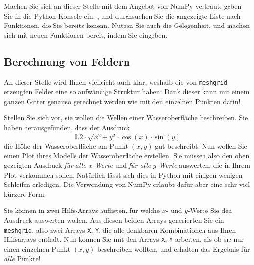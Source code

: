 \begin{hintbox}
Machen Sie sich an dieser Stelle mit dem Angebot von NumPy vertraut: geben Sie in die Python-Konsole ein: , und durchsuchen Sie die angezeigte Liste nach Funktionen, die Sie bereits kenenn. Nutzen Sie auch die Gelegenheit, und machen sich mit neuen Funktionen bereit, indem Sie \eg {} eingeben.
\end{hintbox}

\subsection{Berechnung von Feldern}
An dieser Stelle wird Ihnen vielleicht auch klar, weshalb die von \texttt{meshgrid} erzeugten Felder eine so aufwändige Struktur haben: Dank dieser kann mit einem ganzen Gitter genauso gerechnet werden wie mit den einzelnen Punkten darin!

Stellen Sie sich vor, sie wollen die Wellen einer Wasseroberfläche beschreiben. Sie haben herausgefunden, dass der Ausdruck
\[ 0.2 \cdot \sqrt{x^2 + y^2} \cdot \cos(x) \cdot \sin(y) \]
die Höhe der Wasseroberfläche am Punkt $(x, y)$ gut beschreibt. Nun wollen Sie einen Plot ihres Modells der Wasseroberfläche erstellen. Sie müssen also den oben gezeigten Ausdruck \emph{für alle $x$-Werte} und \emph{für alle $y$-Werte} auswerten, die in Ihrem Plot vorkommen sollen. Natürlich lässt sich dies in Python mit einigen wenigen Schleifen erledigen. Die Verwendung von NumPy erlaubt dafür aber eine sehr viel kürzere Form:

Sie können in zwei Hilfs-Arrays auflisten, für welche $x$- und $y$-Werte Sie den Ausdruck auswerten wollen. Aus diesen beiden Arrays generierten Sie ein \texttt{meshgrid}, also zwei Arrays \texttt{X}, \texttt{Y}, die alle denkbaren Kombinationen aus Ihren Hilfsarrays enthält. Nun können Sie mit den Arrays \texttt{X}, \texttt{Y} arbeiten, als ob sie nur einen einzelnen Punkt $(x, y)$ beschreiben wollten, und erhalten das Ergebnis für \emph{alle} Punkte!


